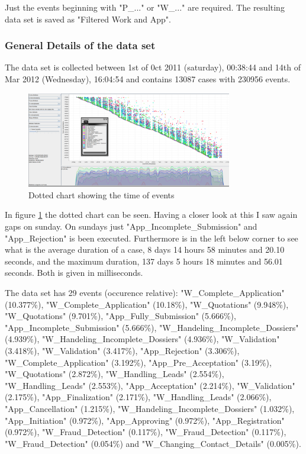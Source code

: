 Just the events beginning with "P\_..." or "W\_..." are required. The resulting data set is saved as "Filtered Work and App".

\subsubsection{General Details of the data set}
The data set is collected between 1st of 0ct 2011 (saturday), 00:38:44 and 14th of Mar 2012 (Wednesday), 16:04:54 and contains 13087 cases with 230956 events. 

\begin{figure}[!htbp]
\centering
\includegraphics[width = 0.8\textwidth]{AppWorkDot.PNG}
\caption{Dotted chart showing the time of events}
\label{fig:AppWorkTimeFlow}
\end{figure}

In figure \ref{fig:AppWorkTimeFlow} the dotted chart can be seen. Having a closer look at this I saw again gaps on sunday. On sundays just "App\_Incomplete\_Submission" and "App\_Rejection" is been executed. Furthermore is in the left below corner to see what is the average duration of a case, 8 days 14 hours 58 minutes and 20.10 seconds, and the maximum duration, 137 days 5 hours 18 minutes and 56.01 seconds. Both is given in milliseconds.

The data set has 29 events (occurence relative): 
"W\_Complete\_Application" (10.377\%), "W\_Complete\_Application" (10.18\%), "W\_Quotations" (9.948\%), "W\_Quotations" (9.701\%), "App\_Fully\_Submission" (5.666\%), "App\_Incomplete\_Submission" (5.666\%), "W\_Handeling\_Incomplete\_Dossiers" (4.939\%), "W\_Handeling\_Incomplete\_Dossiers" (4.936\%), "W\_Validation" (3.418\%), "W\_Validation" (3.417\%), "App\_Rejection" (3.306\%), "W\_Complete\_Application" (3.192\%), "App\_Pre\_Acceptation" (3.19\%), "W\_Quotations" (2.872\%), "W\_Handling\_Leads" (2.554\%), "W\_Handling\_Leads" (2.553\%), "App\_Acceptation" (2.214\%), "W\_Validation" (2.175\%), "App\_Finalization" (2.171\%), "W\_Handling\_Leads" (2.066\%), "App\_Cancellation" (1.215\%), "W\_Handeling\_Incomplete\_Dossiers" (1.032\%), "App\_Initiation" (0.972\%), "App\_Approving" (0.972\%), "App\_Registration" (0.972\%), "W\_Fraud\_Detection" (0.117\%), "W\_Fraud\_Detection" (0.117\%), "W\_Fraud\_Detection" (0.054\%) and "W\_Changing\_Contact\_Details" (0.005\%).

